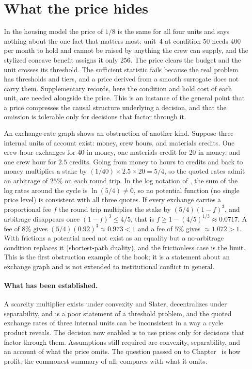 \section{What the price hides}

In the housing model the price of $1/8$ is the same for all four units and says nothing about the one fact that matters most: unit~4 at condition $50$ needs $400$ per month to hold and cannot be raised by anything the crew can supply, and the stylized concave benefit assigns it only $256$. The price clears the budget and the unit crosses its threshold. The sufficient statistic fails because the real problem has thresholds and tiers, and a price derived from a smooth surrogate does not carry them. Supplementary records, here the condition and hold cost of each unit, are needed alongside the price. This is an instance of the general point that a price compresses the causal structure underlying a decision, and that the omission is tolerable only for decisions that factor through it.

An exchange-rate graph shows an obstruction of another kind. Suppose three internal units of account exist: money, crew hours, and materials credits. One crew hour exchanges for $40$ in money, one materials credit for $20$ in money, and one crew hour for $2.5$ credits. Going from money to hours to credits and back to money multiplies a stake by $(1/40)\times 2.5\times 20=5/4$, so the quoted rates admit an arbitrage of $25\%$ on each round trip. In the log notation of , the sum of the log rates around the cycle is $\ln(5/4)\ne 0$, so no potential function (no single price level) is consistent with all three quotes. If every exchange carries a proportional fee $f$ the round trip multiplies the stake by $(5/4)(1-f)^3$, and arbitrage disappears once $(1-f)^3\le 4/5$, that is $f\ge 1-(4/5)^{1/3}\approx 0.0717$. A fee of $8\%$ gives $(5/4)(0.92)^3\approx 0.973<1$ and a fee of $5\%$ gives $\approx 1.072>1$. With frictions a potential need not exist as an equality but a no-arbitrage condition replaces it (shortest-path duality), and the frictionless case is the limit. This is the first obstruction example of the book; it is a statement about an exchange graph and is not extended to institutional conflict in general.

\paragraph{What has been established.} A scarcity multiplier exists under convexity and Slater, decentralizes under separability, and is a poor statement of a threshold problem, and the quoted exchange rates of three internal units can be inconsistent in a way a cycle product reveals. The decision now enabled is to use prices only for decisions that factor through them. Assumptions still required are convexity, separability, and an account of what the price omits. The question passed on to Chapter~ is how profit, the commonest summary of all, compares with what it omits.


